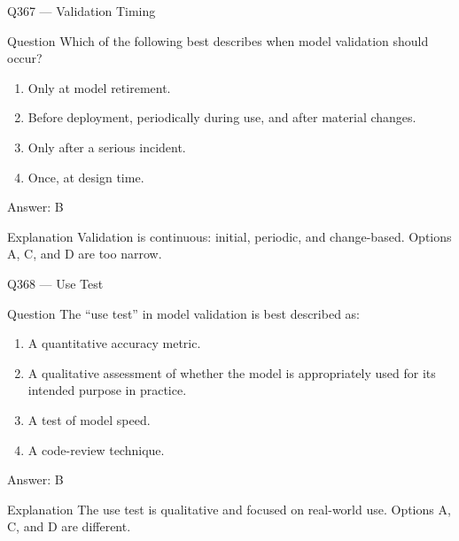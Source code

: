 \documentclass[aspectratio=169,8pt]{beamer}
\begin{document}
	\begin{frame}{Q367 --- Validation Timing}
		\begin{block}{Question}
			Which of the following best describes when model validation should occur?
			\begin{enumerate}
				\item Only at model retirement.
				\item Before deployment, periodically during use, and after material changes.
				\item Only after a serious incident.
				\item Once, at design time.
			\end{enumerate}
		\end{block}
		\begin{exampleblock}{Answer: B}\end{exampleblock}
		\begin{block}{Explanation}
			Validation is continuous: initial, periodic, and change-based. Options A, C, and D are too narrow.
		\end{block}
	\end{frame}
	
	\begin{frame}{Q368 --- Use Test}
		\begin{block}{Question}
			The ``use test'' in model validation is best described as:
			\begin{enumerate}
				\item A quantitative accuracy metric.
				\item A qualitative assessment of whether the model is appropriately used for its intended purpose in practice.
				\item A test of model speed.
				\item A code-review technique.
			\end{enumerate}
		\end{block}
		\begin{exampleblock}{Answer: B}\end{exampleblock}
		\begin{block}{Explanation}
			The use test is qualitative and focused on real-world use. Options A, C, and D are different.
		\end{block}
	\end{frame}
	
\end{document}

